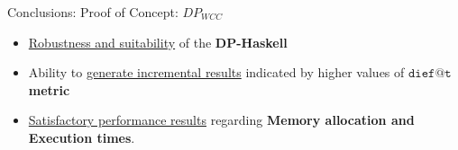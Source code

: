 
\begin{frame}[fragile]{Conclusions: Proof of Concept: $DP_{WCC}$}
  \begin{itemize}
    \setlength\itemsep{2em}
    \item \underline{\color{red}Robustness and suitability} of the \textbf{DP-Haskell}
    \item Ability to \underline{\color{red}generate incremental results} indicated by higher values of \textbf{$\mathtt{dief@t}$ metric}
    \item \underline{\color{red}Satisfactory performance results} regarding \textbf{Memory allocation and Execution times}. 
  \end{itemize}
\end{frame}

